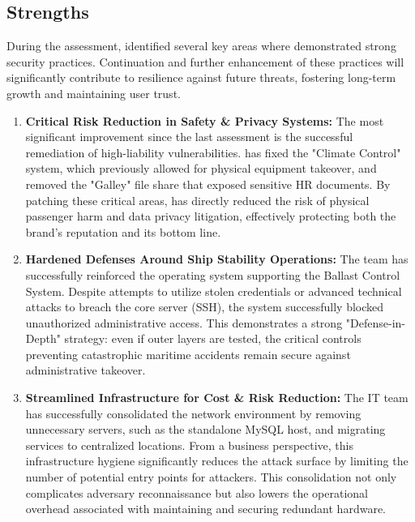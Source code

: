 \newpage

\subsection{Strengths}

During the assessment, \team identified several key areas where \client demonstrated strong security practices. Continuation and further enhancement of these practices will significantly contribute to \clientP resilience against future threats, fostering long-term growth and maintaining user trust.

\begin{enumerate}
    \item \textbf{Critical Risk Reduction in Safety \& Privacy Systems:}  
    The most significant improvement since the last assessment is the successful remediation of high-liability vulnerabilities. \client has fixed the "Climate Control" system, which previously allowed for physical equipment takeover, and removed the "Galley" file share that exposed sensitive HR documents. By patching these critical areas, \client has directly reduced the risk of physical passenger harm and data privacy litigation, effectively protecting both the brand's reputation and its bottom line.

    \item \textbf{Hardened Defenses Around Ship Stability Operations:}  
    The team has successfully reinforced the operating system supporting the Ballast Control System. Despite \teamP attempts to utilize stolen credentials or advanced technical attacks to breach the core server (SSH), the system successfully blocked unauthorized administrative access. This demonstrates a strong "Defense-in-Depth" strategy: even if outer layers are tested, the critical controls preventing catastrophic maritime accidents remain secure against administrative takeover.
    
    \item \textbf{Streamlined Infrastructure for Cost \& Risk Reduction:}  
    The IT team has successfully consolidated the network environment by removing unnecessary servers, such as the standalone MySQL host, and migrating services to centralized locations. From a business perspective, this infrastructure hygiene significantly reduces the attack surface by limiting the number of potential entry points for attackers. This consolidation not only complicates adversary reconnaissance but also lowers the operational overhead associated with maintaining and securing redundant hardware.
\end{enumerate}